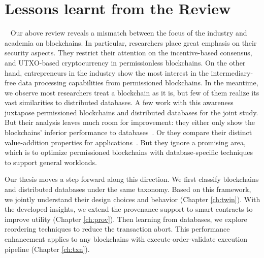 \section{Lessons learnt from the Review} 
Our above review reveals a mismatch between the focus of the industry and academia on blockchains. 
In particular, researchers place great emphasis on their security aspects. They restrict their attention on the incentive-based consensus, and UTXO-based cryptocurrency in permissionless blockchains. On the other hand, entrepreneurs in the industry show the most interest in the intermediary-free data processing capabilities from permissioned blockchains. 
In the meantime, we observe most researchers treat a blockchain as it is, but few of them realize its vast similarities to distributed databases. A few work with this awareness juxtapose permissioned blockchains and distributed databases for the joint study. 
But their analysis leaves much room for improvement: they either only show the blockchains' inferior performance to databases~\cite{dinh2017blockbench,chen2018comparative}. Or they compare their distinct value-addition properties for applications~\cite{chowdhury2018blockchain,wust2018you,yaga2019blockchain}. 
But they ignore a promising area, which is to optimize permissioned blockchains with database-specific techniques to support general workloads. 

Our thesis moves a step forward along this direction. 
We first classify blockchains and distributed databases under the same taxonomy.
Based on this framework, we jointly understand their design choices and behavior (Chapter \ref{ch:twin}). 
With the developed insights, we extend the provenance support to smart contracts to improve utility (Chapter \ref{ch:prov}). Then learning from databases, we explore reordering techniques to reduce the transaction abort. 
This performance enhancement applies to any blockchains with execute-order-validate execution pipeline (Chapter \ref{ch:txn}).  

